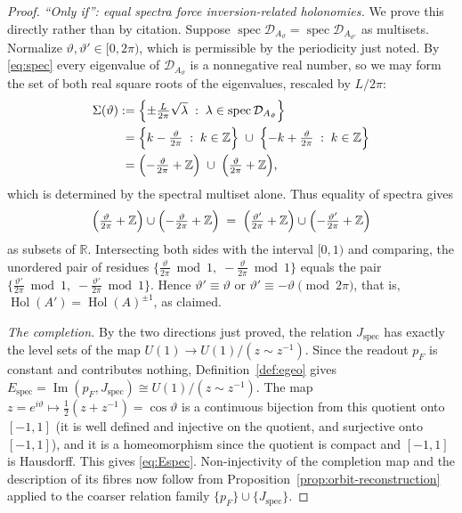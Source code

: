 \documentclass[11pt,a4paper]{article}
\theoremstyle{plain}
\theoremstyle{definition}
\theoremstyle{remark}
\newcommand{\Real}{\mathbb{R}}
\newcommand{\Int}{\mathbb{Z}}
\newcommand{\Hol}{\operatorname{Hol}}
\newcommand{\Imm}{\operatorname{Im}}
\begin{document}
\begin{proof}
\emph{``Only if'': equal spectra force inversion-related holonomies.} We prove this directly rather
than by citation. Suppose $\operatorname{spec}\mathcal{D}_{A_\vartheta}
=\operatorname{spec}\mathcal{D}_{A_{\vartheta'}}$ as multisets. Normalize
$\vartheta,\vartheta'\in[0,2\pi)$, which is permissible by the periodicity just noted. By
\eqref{eq:spec} every eigenvalue of $\mathcal{D}_{A_\vartheta}$ is a nonnegative real number, so we
may form the set of both real square roots of the eigenvalues, rescaled by $L/2\pi$:
\begin{align*}
\Sigma(\vartheta)
&:=\Bigl\{\pm\tfrac{L}{2\pi}\sqrt{\lambda}\;:\;
\lambda\in\operatorname{spec}\mathcal{D}_{A_\vartheta}\Bigr\}
\\
&\phantom{:}=
\Bigl\{k-\tfrac{\vartheta}{2\pi}\;:\;k\in\Int\Bigr\}
\;\cup\;
\Bigl\{-k+\tfrac{\vartheta}{2\pi}\;:\;k\in\Int\Bigr\}
\\
&\phantom{:}=
\Bigl(-\tfrac{\vartheta}{2\pi}+\Int\Bigr)
\;\cup\;
\Bigl(\tfrac{\vartheta}{2\pi}+\Int\Bigr),
\end{align*}
which is determined by the spectral multiset alone. Thus equality of spectra gives
\[
\Bigl(\tfrac{\vartheta}{2\pi}+\Int\Bigr)\cup\Bigl(-\tfrac{\vartheta}{2\pi}+\Int\Bigr)
\;=\;
\Bigl(\tfrac{\vartheta'}{2\pi}+\Int\Bigr)\cup\Bigl(-\tfrac{\vartheta'}{2\pi}+\Int\Bigr)
\]
as subsets of $\Real$.
Intersecting both sides with the interval $[0,1)$ and comparing, the unordered pair of residues
$\{\tfrac{\vartheta}{2\pi}\bmod 1,\;-\tfrac{\vartheta}{2\pi}\bmod 1\}$ equals the pair
$\{\tfrac{\vartheta'}{2\pi}\bmod 1,\;-\tfrac{\vartheta'}{2\pi}\bmod 1\}$. Hence
$\vartheta'\equiv\vartheta$ or $\vartheta'\equiv-\vartheta \pmod{2\pi}$, that is,
$\Hol(A')=\Hol(A)^{\pm1}$, as claimed.

\emph{The completion.} By the two directions just proved, the relation $J_{\mathrm{spec}}$ has
exactly the level sets of the map $U(1)\to U(1)/(z\sim z^{-1})$. Since the readout $p_F$ is constant
and contributes nothing, Definition~\ref{def:egeo} gives
$E_{\mathrm{spec}}=\Imm(p_F,J_{\mathrm{spec}})\cong U(1)/(z\sim z^{-1})$. The map
$z=e^{i\vartheta}\mapsto\tfrac12(z+z^{-1})=\cos\vartheta$ is a continuous bijection from this
quotient onto $[-1,1]$ (it is well defined and injective on the quotient, and surjective onto
$[-1,1]$), and it is a homeomorphism since the quotient is compact and $[-1,1]$ is Hausdorff. This
gives \eqref{eq:Espec}. Non-injectivity of the completion map and the description of its fibres now
follow from Proposition~\ref{prop:orbit-reconstruction} applied to the coarser relation family
$\{p_F\}\cup\{J_{\mathrm{spec}}\}$.
\end{proof}
\end{document}
